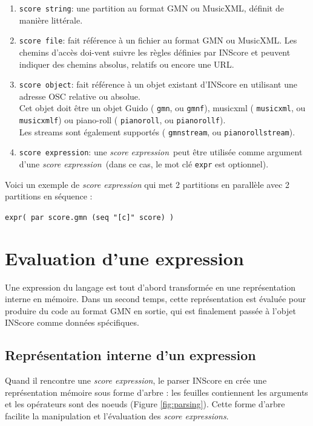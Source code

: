 \documentclass{article}
\newcommand{\OSC}[1]	{{\fontsize{10pt}{10pt} \selectfont\texttt{#1}}}
\newcommand{\sExpr}{\emph{score expression}}
\newcommand{\sExprs}{\emph{score expressions}}
\newcommand{\sample}	[1]			{\vspace{-0.2em}\begin{center}\colorbox{mygrey}{\begin{minipage}[t]{0.97\columnwidth} {\small \texttt{#1}}\end{minipage}}\end{center}}
\begin{document}
\begin{enumerate}
\item \OSC{score string}: une partition au format GMN ou MusicXML, définit de manière littérale.
\item \OSC{score file}:  fait référence à un fichier au format GMN ou MusicXML. Les chemins d'accès doi-vent suivre les règles définies par INScore et peuvent indiquer des chemins absolus, relatifs ou encore une URL.
\item \OSC{score object}:  fait référence à un objet existant d'INScore en utilisant une adresse OSC relative ou absolue.\\ Cet objet doit être un objet Guido (\OSC{gmn}, ou \OSC{gmnf}), musicxml (\OSC{musicxml}, ou \OSC{musicxmlf}) ou piano-roll (\OSC{pianoroll}, ou \OSC{pianorollf}). \\
Les streams sont également supportés (\OSC{gmnstream}, ou \OSC{pianorollstream}).
\item \OSC{score expression}:  une \sExpr\ peut être utilisée comme argument d'une \sExpr\ (dans ce cas, le mot clé \OSC{expr} est optionnel).
\end{enumerate}

Voici un exemple de \emph{score expression} qui met 2 partitions en parallèle avec 2 partitions en séquence :
\sample{expr( par score.gmn (seq "[c]" score) )}

\section{Evaluation d'une expression}
\label{evaluationSpec}
Une expression du langage est tout d'abord transformée en une représentation interne en mémoire. Dans un second temps, cette représentation est évaluée pour produire du code au format GMN en sortie, qui est finalement passée à l'objet INScore comme données spécifiques.

\subsection{Représentation interne d'un expression}

Quand il rencontre une  \sExpr, le parser INScore en crée une représentation mémoire sous forme d'arbre : les feuilles contiennent les arguments et les opérateurs sont des noeuds (Figure \ref{fig:parsing}). Cette forme d'arbre facilite la manipulation et l'évaluation des \sExprs.
\end{document}
